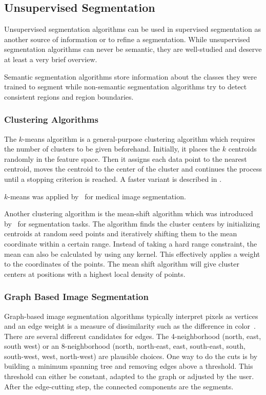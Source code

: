 
\subsection{Unsupervised Segmentation}%
\label{subsec:unsupervised-traditional-segmentation}%

Unsupervised segmentation algorithms can be used in supervised segmentation as
another source of information or to refine a segmentation. While unsupervised
segmentation algorithms can never be semantic, they are well-studied and
deserve at least a very brief overview.

Semantic segmentation algorithms store information about the classes they were
trained to segment while non-semantic segmentation algorithms try to detect
consistent regions and region boundaries.

\subsubsection{Clustering Algorithms}
The $k$-means algorithm is a general-purpose clustering algorithm which
requires the number of clusters to be given beforehand. Initially, it places
the $k$ centroids randomly in the feature space. Then it assigns each
data point to the nearest centroid, moves the centroid to the center of the
cluster and continues the process until a stopping criterion is reached. A
faster variant is described in \cite{hartigan1975clustering}.

$k$-means was applied by~\cite{chen1998image} for medical image segmentation.

Another clustering algorithm is the mean-shift algorithm which was introduced
by~\cite{comaniciu2002mean} for segmentation tasks. The algorithm finds the
cluster centers by initializing centroids at random seed points and iteratively
shifting them to the mean coordinate within a certain range. Instead of taking
a hard range constraint, the mean can also be calculated by using any kernel.
This effectively applies a weight to the coordinates of the points. The mean
shift algorithm will give cluster centers at positions with a highest local
density of points.


\subsubsection{Graph Based Image Segmentation}%
\label{subsec:graph-based-image-segmentation}%
Graph-based image segmentation algorithms typically interpret pixels as
vertices and an edge weight is a measure of dissimilarity such as the
difference in color~\cite{felzenszwalb2004efficient,FelzenszwalbGraphCode}.
There are several different candidates for edges. The 4-neighborhood (north,
east, south west) or an 8-neighborhood (north, north-east, east, south-east,
south, south-west, west, north-west) are plausible choices.
One way to do the cuts is by building a minimum spanning tree and removing
edges above a threshold. This threshold can either be constant, adapted to the
graph or adjusted by the user. After the edge-cutting step, the connected
components are the segments.

